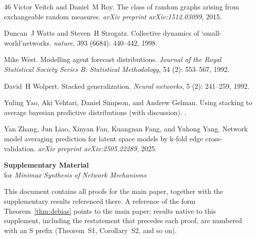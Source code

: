 \documentclass[12pt]{article}
\newcommand{\1}{\mathbf{1}}
\begin{document}
\begin{thebibliography}{46}
Victor Veitch and Daniel~M Roy.
\newblock The class of random graphs arising from exchangeable random measures.
\newblock \emph{arXiv preprint arXiv:1512.03099}, 2015.

Duncan~J Watts and Steven~H Strogatz.
\newblock Collective dynamics of ‘small-world’networks.
\newblock \emph{nature}, 393 (6684): 440--442, 1998.

Mike West.
\newblock Modelling agent forecast distributions.
\newblock \emph{Journal of the Royal Statistical Society Series B: Statistical
  Methodology}, 54 (2): 553--567, 1992.

David~H Wolpert.
\newblock Stacked generalization.
\newblock \emph{Neural networks}, 5 (2): 241--259, 1992.

Yuling Yao, Aki Vehtari, Daniel Simpson, and Andrew Gelman.
\newblock Using stacking to average bayesian predictive distributions (with
  discussion).
.

Yan Zhang, Jun Liao, Xinyan Fan, Kuangnan Fang, and Yuhong Yang.
\newblock Network model averaging prediction for latent space models by k-fold
  edge cross-validation.
\newblock \emph{arXiv preprint arXiv:2505.22289}, 2025.

\end{thebibliography}


\clearpage
\begin{center}
{\Large\bfseries Supplementary Material}\\[0.4em]
{\large for \emph{Minimax Synthesis of Network Mechanisms}}
\end{center}
\bigskip



\noindent This document contains all proofs for the main paper, together with the supplementary
results referenced there. A reference of the form Theorem~\ref{thm:debias} points to the main paper;
results native to this supplement, including the restatement that precedes each proof, are numbered
with an \textsf{S} prefix (Theorem~S1, Corollary~S2, and so on).
\end{document}
